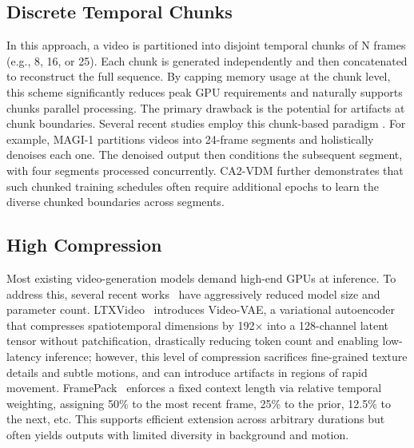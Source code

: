 \subsection{Discrete Temporal Chunks}
\label{sec:arch-chunks}
In this approach, a video is partitioned into disjoint temporal chunks of N frames (e.g., 8, 16, or 25). Each chunk is generated independently and then concatenated to reconstruct the full sequence. By capping memory usage at the chunk level, this scheme significantly reduces peak GPU requirements and naturally supports chunks parallel processing. The primary drawback is the potential for artifacts at chunk boundaries. Several recent studies employ this chunk-based paradigm \cite{teng2025magi1, gao2024ca2vdm, chen2023seine}. For example, MAGI-1 \cite{teng2025magi1} partitions videos into 24-frame segments and holistically denoises each one. The denoised output then conditions the subsequent segment, with four segments processed concurrently. CA2-VDM \cite{gao2024ca2vdm} further demonstrates that such chunked training schedules often require additional epochs to learn the diverse chunked boundaries across segments.


\subsection{High Compression}
\label{sec:arch-compression}
Most existing video-generation models demand high-end GPUs at inference. To address this, several recent works~\cite{zhang2025framepack, hacohen2025ltxvideo, lin2024opensoraplan, jin2024pyramidflow} have aggressively reduced model size and parameter count. LTXVideo~\cite{hacohen2025ltxvideo} introduces Video-VAE, a variational autoencoder that compresses spatiotemporal dimensions by 192× into a 128-channel latent tensor without patchification, drastically reducing token count and enabling low-latency inference; however, this level of compression sacrifices fine-grained texture details and subtle motions, and can introduce artifacts in regions of rapid movement. FramePack~\cite{zhang2025framepack} enforces a fixed context length via relative temporal weighting, assigning 50\% to the most recent frame, 25\% to the prior, 12.5\% to the next, etc. This supports efficient extension across arbitrary durations but often yields outputs with limited diversity in background and motion.

